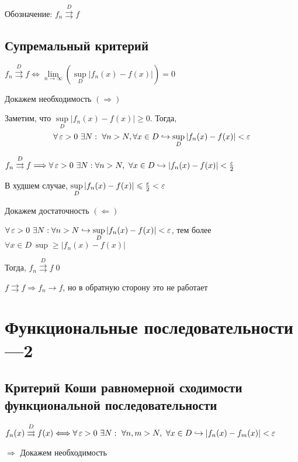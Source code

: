 \documentclass[a4paper, 10pt]{article}
\begin{document}
Обозначение: $f_n\overset{D}{\rightrightarrows} f$

\subsection{Супремальный критерий}
\theorem $f_n\overset{D}{\rightrightarrows} f\Longleftrightarrow \lim\limits_{n\to\infty}\left(\sup\limits_{D} \left|f_n(x)-f(x)\right|\right)=0$

\proof Докажем необходимость $(\Longrightarrow)$

Заметим, что $\sup\limits_{D} \left|f_n(x)-f(x)\right|\geqslant 0$. Тогда,
\begin{equation*}
    \forall\ve >0\ \exists N:\ \forall n>N,\forall x\in D\hookrightarrow \sup\limits_D |f_n(x)-f(x)|<\ve
\end{equation*}

$f_n\overset{D}{\rightrightarrows} f\Longrightarrow \forall\operatorname{\varepsilon}>0\ \exists N:\forall n>N,\ \forall x\in D\hookrightarrow|f_n(x)-f(x)|<\frac{\operatorname{\varepsilon}}{2}$

В худшем случае, $\sup\limits_{D} |f_n(x)-f(x)|\leqslant \frac{\operatorname{\varepsilon}}{2}<\operatorname{\varepsilon}$

\proof Докажем достаточность $(\Longleftarrow)$

$\forall \operatorname{\varepsilon}>0\ \exists N:\forall n>N\hookrightarrow\sup\limits_{D}|f_n(x)-f(x)|<\operatorname{\varepsilon}$, тем более $\forall x\in D\ \sup \geqslant |f_n(x)-f(x)|$ 

Тогда, $f_n\overset{D}{\rightrightarrows} f$\qed 

\comment $f\rightrightarrows f\Longrightarrow f_n\longrightarrow f$, но в обратную сторону это не работает




\newpage
\section{Функциональные последовательности—2}
\subsection{Критерий Коши равномерной сходимости функциональной последовательности}
\theorem $f_n(x)\overset{D}{\rightrightarrows} f(x)\Longleftrightarrow\forall\ve>0\ \exists N:\ \forall n,m>N,\ \forall x\in D\hookrightarrow |f_n(x)-f_m(x)|<\ve$

\proof $\Longrightarrow$ Докажем необходимость
\end{document}
